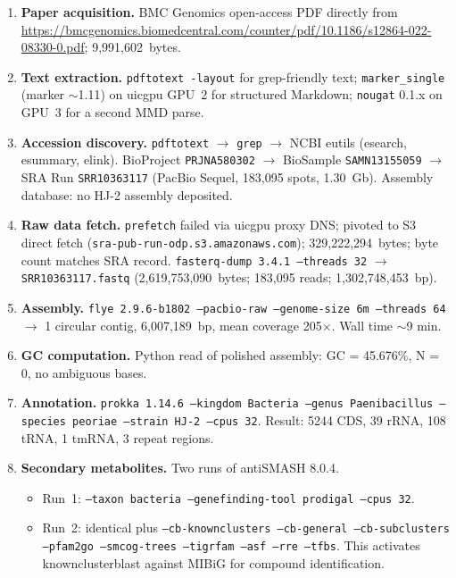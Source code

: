 \documentclass[11pt,a4paper]{article}
\begin{document}
\begin{enumerate}
\item \textbf{Paper acquisition.} BMC Genomics open-access PDF directly from
      \url{https://bmcgenomics.biomedcentral.com/counter/pdf/10.1186/s12864-022-08330-0.pdf};
      9{,}991{,}602~bytes.
\item \textbf{Text extraction.} \texttt{pdftotext -layout} for grep-friendly text; \texttt{marker\_single}
      (marker $\sim$1.11) on uicgpu GPU~2 for structured Markdown; \texttt{nougat} 0.1.x on GPU~3 for a second
      MMD parse.
\item \textbf{Accession discovery.} \texttt{pdftotext} $\rightarrow$ \texttt{grep} $\rightarrow$
      NCBI eutils (esearch, esummary, elink). BioProject \texttt{PRJNA580302}
      $\rightarrow$ BioSample \texttt{SAMN13155059} $\rightarrow$ SRA Run
      \texttt{SRR10363117} (PacBio Sequel, 183{,}095 spots, 1.30~Gb). Assembly database:
      no HJ-2 assembly deposited.
\item \textbf{Raw data fetch.} \texttt{prefetch} failed via uicgpu proxy DNS; pivoted to
      S3 direct fetch (\texttt{sra-pub-run-odp.s3.amazonaws.com}); 329{,}222{,}294~bytes;
      byte count matches SRA record. \texttt{fasterq-dump 3.4.1 --threads 32} $\rightarrow$
      \texttt{SRR10363117.fastq} (2{,}619{,}753{,}090~bytes; 183{,}095 reads; 1{,}302{,}748{,}453~bp).
\item \textbf{Assembly.} \texttt{flye 2.9.6-b1802 --pacbio-raw --genome-size 6m --threads 64}
      $\rightarrow$ 1 circular contig, 6{,}007{,}189~bp, mean coverage 205${\times}$. Wall time
      $\sim$9 min.
\item \textbf{GC computation.} Python read of polished assembly:
      GC = 45.676\%, N = 0, no ambiguous bases.
\item \textbf{Annotation.} \texttt{prokka 1.14.6 --kingdom Bacteria --genus Paenibacillus
      --species peoriae --strain HJ-2 --cpus 32}. Result: 5244 CDS, 39 rRNA, 108 tRNA,
      1 tmRNA, 3 repeat regions.
\item \textbf{Secondary metabolites.} Two runs of antiSMASH 8.0.4.
      \begin{itemize}
      \item Run~1: \texttt{--taxon bacteria --genefinding-tool prodigal --cpus 32}.
      \item Run~2: identical plus \texttt{--cb-knownclusters --cb-general --cb-subclusters
            --pfam2go --smcog-trees --tigrfam --asf --rre --tfbs}. This activates
            knownclusterblast against MIBiG for compound identification.

\end{itemize}
\end{enumerate}
\end{document}
